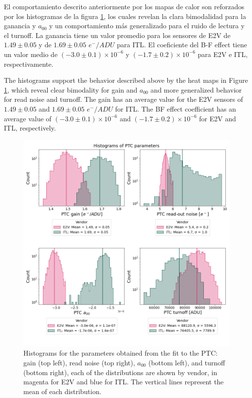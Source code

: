 \vspace{3mm}

El comportamiento descrito anteriormente por los mapas de calor son reforzados por los histogramas de la figura \ref{fig:Histogram_PTC}, los cuales revelan la clara bimodalidad para la ganancia y $a_{00}$ y un comportamiento más generalizado para el ruido de lectura y el turnoff. La ganancia tiene un valor promedio para los sensores de E2V de $1.49 \pm 0.05$ y de $1.69 \pm 0.05$ $e^{-}/ADU$ para ITL. El coeficiente del B-F effect tiene un valor medio de $(-3.0 \pm 0.1)\times 10 ^{-6}$  y $(-1.7 \pm 0.2)\times 10 ^{-6}$ para E2V e ITL, respectivamente.

The histograms support the behavior described above by the heat maps in Figure \ref{fig:Histogram_PTC}, which reveal clear bimodality for gain and $a_{00}$ and more generalized behavior for read noise and turnoff. The gain has an average value for the E2V sensors of $1.49 \pm 0.05$ and $1.69 \pm 0.05$ $e^{-}/ADU$ for ITL. The BF effect coefficient has an average value of $(-3.0 \pm 0.1)\times 10 ^{-6}$ and $(-1.7 \pm 0.2)\times 10 ^{-6}$ for E2V and ITL, respectively.

\vspace{3mm}

\begin{figure}[!htb]
    \centering
    \includegraphics[width=\textwidth]{Figures/Histograms_PTC.png}
    \caption{Histograms for the parameters obtained from the fit to the PTC: gain (top left), read noise (top right), $a_{00}$ (bottom left), and turnoff (bottom right), each of the distributions are shown by vendor, in magenta for E2V and blue for ITL. The vertical lines represent the mean of each distribution. }
    \label{fig:Histogram_PTC}
\end{figure}

